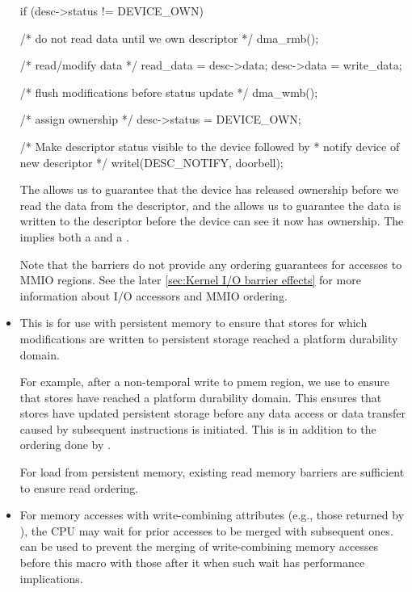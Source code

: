 \begin{itemize}
\begin{VerbatimU}
	if (desc->status != DEVICE_OWN) {
		/* do not read data until we own descriptor */
		dma_rmb();

		/* read/modify data */
		read_data = desc->data;
		desc->data = write_data;

		/* flush modifications before status update */
		dma_wmb();

		/* assign ownership */
		desc->status = DEVICE_OWN;

		/* Make descriptor status visible to the device followed by
		 * notify device of new descriptor
		 */
		writel(DESC_NOTIFY, doorbell);
	}
\end{VerbatimU}

     The  allows us to guarantee that the device has released
     ownership before we read the data from the descriptor, and the
      allows us to guarantee the data is written to the
     descriptor before the device can see it now has ownership.
     The  implies both a  and a .

     Note that the  barriers do not provide any ordering
     guarantees for accesses to MMIO regions.
     See the later \cref{sec:Kernel I/O barrier effects} for more
     information about I/O accessors and MMIO ordering.

 \item {}

     This is for use with persistent memory to ensure that stores for which
     modifications are written to persistent storage reached a platform
     durability domain.

     For example, after a non-temporal write to pmem region, we use
      to ensure that stores have reached a platform
     durability domain.
     This ensures that stores have updated persistent storage before any
     data access or data transfer caused by subsequent instructions is
     initiated.
     This is in addition to the ordering done by .

     For load from persistent memory, existing read memory barriers are
     sufficient to ensure read ordering.

 \item {}

     For memory accesses with write-combining attributes (e.g., those returned
     by ), the CPU may wait for prior accesses to be merged
     with subsequent ones.
      can be used to prevent the merging of write-combining
     memory accesses before this macro with those after it when such wait
     has performance implications.
\end{itemize}


